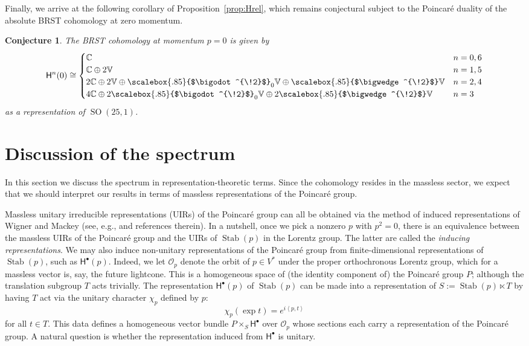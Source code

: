 \documentclass[11pt,reqno,a4paper,final]{amsart}
\newcommand\ext[1]{\scalebox{.85}{$\bigwedge^{\!#1}$}}
\newcommand\sym[1]{\scalebox{.85}{$\bigodot^{\!#1}$}}
\theoremstyle{plain}
\newtheorem{conjecture}[lemma]{Conjecture}
\theoremstyle{definition}
\newcommand{\sH}{\mathsf{H}}
\newcommand{\eO}{\mathcal{O}}
\newcommand{\Stab}{\operatorname{Stab}}
\newcommand{\VV}{\mathbb{V}}
\newcommand{\CC}{\mathbb{C}}
\newcommand{\1}{\mathbb{1}}
\newcommand{\SO}{\operatorname{SO}}
\numberwithin{equation}{section}
\begin{document}
Finally, we arrive at the following corollary of
Proposition~\ref{prop:Hrel}, which remains conjectural subject to the
Poincaré duality of the absolute BRST cohomology at zero momentum.

\begin{conjecture}
  \label{sec:conj:zero-momentum}
  The BRST cohomology at momentum $p=0$ is given by
  \begin{equation}
    \sH^n(0) \cong
    \begin{cases}
      \CC & n=0,6\\
      \CC \oplus 2 \VV & n=1,5\\
      2 \CC \oplus 2 \VV \oplus \sym{2}_0 \VV \oplus \ext{2} \VV & n=2,4\\
      4 \CC \oplus 2 \sym{2}_0 \VV \oplus 2 \ext{2} \VV & n=3\\
    \end{cases}
  \end{equation}
  as a representation of $\SO(25,1)$.
\end{conjecture}



\section{Discussion of the spectrum}
\label{sec:phys-interpr}

In this section we discuss the spectrum in representation-theoretic
terms.  Since the cohomology resides in the massless sector, we expect
that we should interpret our results in terms of massless
representations of the Poincaré group.

Massless unitary irreducible representations (UIRs) of the Poincaré
group can all be obtained via the method of induced representations of
Wigner and Mackey (see, e.g.,
\cite[Appendix~A]{Figueroa-OFarrill:2023qty} and references therein).
In a nutshell, once we pick a nonzero $p$ with $p^2 = 0$, there is an
equivalence between the massless UIRs of the Poincaré group and the
UIRs of $\Stab(p)$ in the Lorentz group. The latter are called the
\emph{inducing representations}. We may also induce non-unitary
representations of the Poincaré group from finite-dimensional
representations of $\Stab(p)$, such as $\sH^\bullet(p)$. Indeed, we
let $\eO_p$ denote the orbit of $p \in V^*$ under the proper
orthochronous Lorentz group, which for a massless vector is, say, the
future lightcone. This is a homogeneous space of (the identity
component of) the Poincaré group $P$; although the translation
subgroup $T$ acts trivially. The representation $\sH^\bullet(p)$ of
$\Stab(p)$ can be made into a representation of
$S := \Stab(p) \ltimes T$ by having $T$ act via the unitary character
$\chi_p$ defined by $p$:
\begin{equation}
  \chi_p(\exp t) = e^{i \left<p,t\right>}
\end{equation}
for all $t \in T$.  This data defines a homogeneous vector bundle $P
\times_S  \sH^\bullet$ over $\eO_p$ whose sections each carry a
representation of the Poincaré group.  A natural question is whether
the representation induced from $\sH^\bullet$ is unitary.
\end{document}
